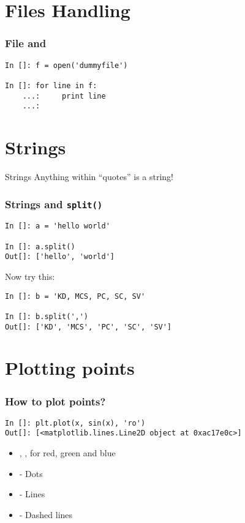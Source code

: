 \documentclass[14pt,compress]{beamer}
\newcounter{time}
\newcommand{\inctime}[1]{\addtocounter{time}{#1}{\tiny \thetime\ m}}
\newcommand{\typ}[1]{\lstinline{#1}}
\newcommand{\kwrd}[1]{ \texttt{\textbf{\color{blue}{#1}}}  }
\begin{document}
\section{Files Handling}
\begin{frame}[fragile]
    \frametitle{File and \kwrd{for}}
\begin{lstlisting}
In []: f = open('dummyfile')

In []: for line in f:
    ...:     print line
    ...:  
\end{lstlisting}
\inctime{5}
\end{frame}

\section{Strings}
\begin{frame}{Strings}
Anything within ``quotes'' is a string!
\end{frame}

\begin{frame}[fragile]\frametitle{Strings and \typ{split()}}
  \begin{lstlisting}
In []: a = 'hello world'

In []: a.split()
Out[]: ['hello', 'world']
  \end{lstlisting}
Now try this:
  \begin{lstlisting}
In []: b = 'KD, MCS, PC, SC, SV'

In []: b.split(',')
Out[]: ['KD', 'MCS', 'PC', 'SC', 'SV']
  \end{lstlisting}
\inctime{5}
\end{frame}

\section{Plotting points}
\begin{frame}[fragile]
\frametitle{How to plot points?}
\begin{lstlisting}
In []: plt.plot(x, sin(x), 'ro')
Out[]: [<matplotlib.lines.Line2D object at 0xac17e0c>]
\end{lstlisting}
\begin{itemize}
  \item \kwrd{'r'},\kwrd{'g'},\kwrd{'b'} for red, green and blue
  \item \kwrd{'o'} - Dots
  \item \kwrd{'-'} - Lines
  \item \kwrd{'- -'} - Dashed lines
\end{itemize}
\inctime{5}
\end{frame}
\end{document}
